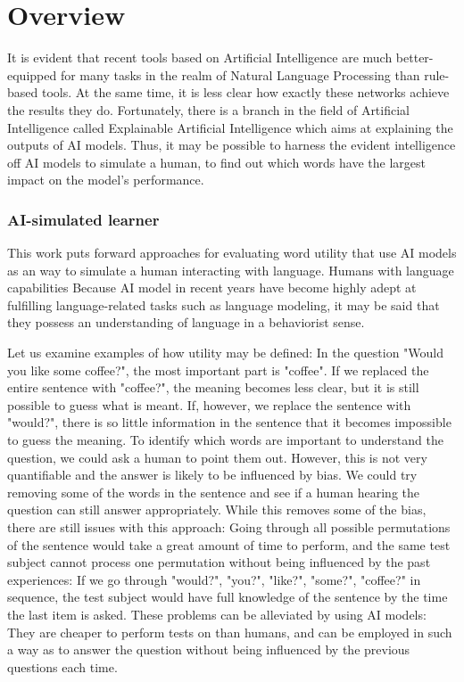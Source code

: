 \section{Overview}
It is evident that recent tools based on Artificial Intelligence are much better-equipped for many tasks in the realm of Natural Language Processing than rule-based tools.
At the same time, it is less clear how exactly these networks achieve the results they do.
Fortunately, there is a branch in the field of Artificial Intelligence called Explainable Artificial Intelligence which aims at explaining the outputs of AI models.
Thus, it may be possible to harness the evident intelligence off AI models to simulate a human, to find out which words have the largest impact on the model's performance.

\subsubsection{AI-simulated learner}
This work puts forward approaches for evaluating word utility that use AI models as an way to simulate a human interacting with language.
Humans with language capabilities
Because AI model in recent years have become highly adept at fulfilling language-related tasks such as language modeling, it may be said that they possess an understanding of language in a behaviorist sense.

Let us examine examples of how utility may be defined:
In the question "Would you like some coffee?", the most important part is "coffee".
If we replaced the entire sentence with "coffee?", the meaning becomes less clear, but it is still possible to guess what is meant.
If, however, we replace the sentence with "would?", there is so little information in the sentence that it becomes impossible to guess the meaning.
To identify which words are important to understand the question, we could ask a human to point them out.
However, this is not very quantifiable and the answer is likely to be influenced by bias.
We could try removing some of the words in the sentence and see if a human hearing the question can still answer appropriately.
While this removes some of the bias, there are still issues with this approach:
Going through all possible permutations of the sentence would take a great amount of time to perform, and the same test subject cannot process one permutation without being influenced by the past experiences:
If we go through "would?", "you?", "like?", "some?", "coffee?" in sequence, the test subject would have full knowledge of the sentence by the time the last item is asked.
These problems can be alleviated by using AI models: They are cheaper to perform tests on than humans, and can be employed in such a way as to answer the question without being influenced by the previous questions each time.

